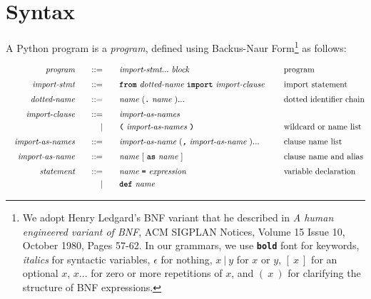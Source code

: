 \section{Syntax}

A Python program is a \emph{program}, defined using Backus-Naur Form\footnote{
We adopt Henry Ledgard's BNF variant that he described in
\emph{A human engineered variant of BNF}, ACM SIGPLAN Notices, Volume 15 Issue 10,
October 1980, Pages 57-62. In our grammars, we use \textbf{\texttt{bold}} font for keywords,
{\it italics} for syntactic variables, $\epsilon$ for nothing,
$x\ |\ y$ for $x$ or $y$, $[\ x\ ]$ for an optional $x$,
$ x ...$ for zero or more repetitions of $x$, and $(\ x\ )$ for clarifying the structure of BNF expressions.}
as follows:

\begin{alignat*}{9}
&& \textit{program}    &&\quad ::= &\quad && \textit{import-stmt} ... \ \textit{block}
                                                           && \textrm{program} \\[1mm]
&& \textit{import-stmt}    &&\quad ::= &\quad && \textbf{\texttt{from}}\ \textit{dotted-name} \ \textbf{\texttt{import}}\ \textit{import-clause} \ \quad
                                                           && \textrm{import statement} \\[1mm]
&& \textit{dotted-name}   && ::= &\quad &&  \textit{name}\ (\textbf{\texttt{.}} \ \textit{name}\ )... \ && \textrm{dotted identifier chain} \\[1mm]
&& \textit{import-clause}   && ::= &\quad && \textit{import-as-names} \\
&&                            &&  | &\quad && \textbf{\texttt{(}} \ \textit{import-as-names} \ \textbf{\texttt{)}} \ && \textrm{wildcard or name list} \\[1mm]
&& \textit{import-as-names}   && ::= &\quad &&  \textit{import-as-name}\ (\textit{\texttt{,}} \ \textit{import-as-name}\ ) ... 
                              && \textrm{clause name list} \\[1mm]
&& \textit{import-as-name}   && ::= &\quad &&  \textit{name}\ [\ \textbf{\texttt{as}} \ \textit{name}\ ]  && \textrm{clause name and alias}\\[1mm]
&& \textit{statement}    &&\quad ::= &\quad && \textit{name} \ \textbf{\texttt{=}}\ \textit{expression}
                                                           && \textrm{variable declaration} \\
&&                       && |   &\quad && \textbf{\texttt{def}}\  \textit{name} \ 

\end{alignat*}
